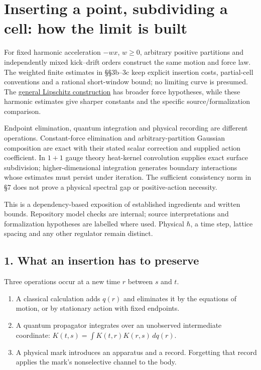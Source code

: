 \documentclass[11pt,a4paper]{article}
\newcommand{\tightlist}{\setlength{\itemsep}{0pt}\setlength{\parskip}{0pt}}
\begin{document}
\hypertarget{inserting-a-point-subdividing-a-cell-how-the-limit-is-built}{%
\section{Inserting a point, subdividing a cell: how the limit is
built}\label{inserting-a-point-subdividing-a-cell-how-the-limit-is-built}}

For fixed harmonic acceleration \(-wx\), \(w\ge0\), arbitrary positive
partitions and independently mixed kick--drift orders construct the same
motion and force law. The weighted finite estimates in §§3b--3c keep
explicit insertion costs, partial-cell conventions and a rational
short-window bound; no limiting curve is presumed. The
\href{balaban-ode-lesson.md}{general Lipschitz construction} has broader
force hypotheses, while these harmonic estimates give sharper constants
and the specific source/formalization comparison.

Endpoint elimination, quantum integration and physical recording are
different operations. Constant-force elimination and arbitrary-partition
Gaussian composition are exact with their stated scalar correction and
supplied action coefficient. In \(1+1\) gauge theory heat-kernel
convolution supplies exact surface subdivision; higher-dimensional
integration generates boundary interactions whose estimates must persist
under iteration. The sufficient consistency norm in §7 does not prove a
physical spectral gap or positive-action necessity.

This is a dependency-based exposition of established ingredients and
written bounds. Repository model checks are internal; source
interpretations and formalization hypotheses are labelled where used.
Physical \(\hbar\), a time step, lattice spacing and any other regulator
remain distinct.

\hypertarget{what-an-insertion-has-to-preserve}{%
\subsection{1. What an insertion has to
preserve}\label{what-an-insertion-has-to-preserve}}

Three operations occur at a new time \(r\) between \(s\) and \(t\).

\begin{enumerate}
\def\labelenumi{\arabic{enumi}.}
\tightlist
\item
  A classical calculation adds \(q(r)\) and eliminates it by the
  equations of motion, or by stationary action with fixed endpoints.
\item
  A quantum propagator integrates over an unobserved intermediate
  coordinate: \(K(t,s)=\int K(t,r)K(r,s)\,dq(r)\).
\item
  A physical mark introduces an apparatus and a record. Forgetting that
  record applies the mark's nonselective channel to the body.
\end{enumerate}
\end{document}
